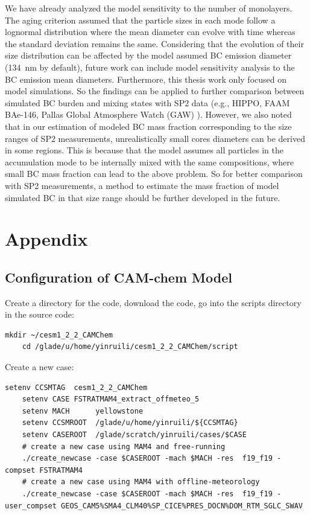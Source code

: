 \documentclass[12pt, fullpage]{uiucthesis2009_2}
\begin{document}
		We have already analyzed the model sensitivity to the number of monolayers. The aging criterion assumed that the particle sizes in each mode follow a lognormal distribution where the mean diameter can evolve with time whereas the standard deviation remains the same. Considering that the evolution of their size distribution can be affected by the model assumed BC emission diameter (134~nm by default), future work can include model sensitivity analysis to the BC emission mean diameters. Furthermore, this thesis work only focused on model simulations. So the findings can be applied to further comparison between simulated BC burden and mixing states with SP2 data (e.g., HIPPO, FAAM BAe-146, Pallas Global Atmosphere Watch (GAW) ). However, we also noted that in our estimation of modeled BC mass fraction corresponding to the size ranges of SP2 measurements, unrealistically small cores diameters can be derived in some regions. This is because that the model assumes all particles in the accumulation mode to be internally mixed with the same compositions, where small BC mass fraction can lead to the above problem. So for better comparison with SP2 measurements, a method to estimate the mass fraction of model simulated BC in that size range should be further developed in the future.
		
		 
		


	
	
	\chapter{Appendix}
	
	\section{Configuration of CAM-chem Model}
	Create a directory for the code, download the code, go into the scripts directory in the source code:
	\begin{lstlisting}[xleftmargin=0.01\textwidth, xrightmargin=0.01\textwidth]
	mkdir ~/cesm1_2_2_CAMChem
	cd /glade/u/home/yinruili/cesm1_2_2_CAMChem/script
	\end{lstlisting}
	
	Create a new case:
	\begin{lstlisting}[xleftmargin=0.01\textwidth, xrightmargin=0.01\textwidth]
	setenv CCSMTAG	cesm1_2_2_CAMChem
	setenv CASE	FSTRATMAM4_extract_offmeteo_5
	setenv MACH      yellowstone
	setenv CCSMROOT  /glade/u/home/yinruili/${CCSMTAG}
	setenv CASEROOT  /glade/scratch/yinruili/cases/$CASE
	# create a new case using MAM4 and free-running
	./create_newcase -case $CASEROOT -mach $MACH -res  f19_f19 -compset FSTRATMAM4
	# create a new case using MAM4 with offline-meteorology
	./create_newcase -case $CASEROOT -mach $MACH -res  f19_f19 -user_compset GEOS_CAM5%SMA4_CLM40%SP_CICE%PRES_DOCN%DOM_RTM_SGLC_SWAV 
	\end{lstlisting}
	
\end{document}
